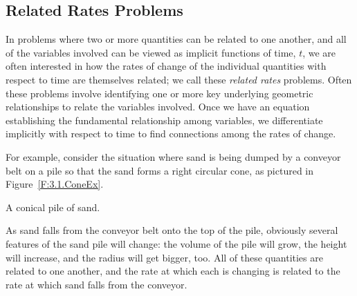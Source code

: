 
\subsection*{Related Rates Problems}

In problems where two or more quantities can be related to one another, and all of the variables involved can be viewed as implicit functions of time, $t$, we are often interested in how the rates of change of the individual quantities with respect to time are themselves related; we call these \emph{related rates} problems.  Often these problems involve identifying one or more key underlying geometric relationships to relate the variables involved.  Once we have an equation establishing the fundamental relationship among variables, we differentiate implicitly with respect to time to find connections among the rates of change.

For example, consider the situation where sand is being dumped by a conveyor belt on a pile so that the sand forms a right circular cone, as pictured in Figure~\ref{F:3.1.ConeEx}.

\begin{marginfigure}[-2cm] %
\caption{A conical pile of sand.} \label{F:3.1.ConeEx}
\end{marginfigure}

As sand falls from the conveyor belt onto the top of the pile, obviously several features of the sand pile will change:  the volume of the pile will grow, the height will increase, and the radius will get bigger, too.  All of these quantities are related to one another, and the rate at which each is changing is related to the rate at which sand falls from the conveyor.

